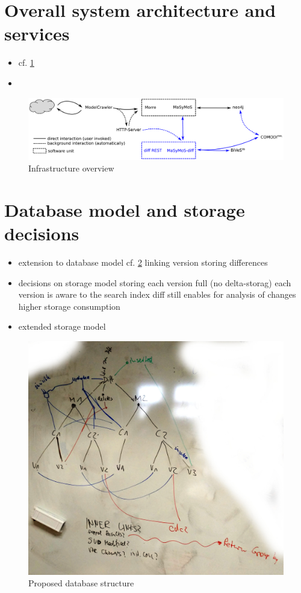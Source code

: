 \section{Overall system architecture and services}
\begin{itemize}
	\item cf. \ref{fig:system-overview}
	\item {}
\end{itemize}

\begin{figure}[h]
	\includegraphics[width=\textwidth]{resources/system-overview.pdf}
	\caption{Infrastructure overview}
	\label{fig:system-overview}
\end{figure}

\section{Database model and storage decisions}
\begin{itemize}
\item extension to database model cf. \ref{fig:db-model}
	\subitem linking version
	\subitem storing differences
\item decisions on storage model
	\subitem storing each version full (no delta-storag)
	\subitem each version is aware to the search index
	\subitem diff still enables for analysis of changes
	\subitem higher storage consumption
\item extended storage model
\end{itemize}

\begin{figure}[h]
	\includegraphics[width=\textwidth]{resources/db_structure.jpg}
	\caption{Proposed database structure}
	\label{fig:db-model}
\end{figure}
